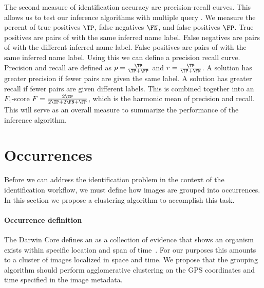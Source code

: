         The second measure of identification accuracy are precision-recall
          curves.
        This allows us to test our inference algorithms with multiple query
          \annots{}.
        We measure the percent of true positives $\TP$, false negatives $\FN$,
          and false positives $\FP$.
        True positives are \groundtrue{} pairs of \annots{} with the same
          inferred name label.
        False negatives are \groundtrue{} pairs of \annots{} with the
          different inferred name label.
        False positives are \groundfalse{} pairs of \annots{} with the same
          inferred name label.
        Using this we can define a precision recall curve.
        Precision and recall are defined as $p = \frac{\TP}{\TP + \FP}$ and $r
          = \frac{\TP}{\TP + \FN}$.
        A solution has greater precision if fewer \groundfalse{} pairs are
          given the same label.
        A solution has greater recall if fewer \groundtrue{} pairs are given
          different labels.
        This is combined together into an $F_1$-score $F = \frac{2\TP}{2\TP +
          2\FN + \FP}$, which is the harmonic mean of precision and recall.
        This will serve as an overall measure to summarize the performance of
          the inference algorithm.

\section{Occurrences}\label{sec:occurgroup}
    Before we can address the identification problem in the context of the
      identification workflow, we must define how images are grouped into
      occurrences.
    In this section we propose a clustering algorithm to accomplish this task.

    \paragraph{Occurrence definition}
    The Darwin Core defines an \occurrence{} as a collection of evidence that
      shows an organism exists within specific location and span of
      time~\cite{wieczorek_darwin_2012}.
    For our purposes this amounts to a cluster of images localized in space
      and time.
    We propose that the \occurrence{} grouping algorithm should perform
      agglomerative clustering on the GPS coordinates and time specified in the
      image metadata.

